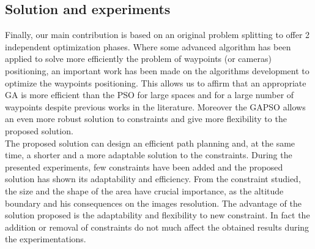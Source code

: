 \subsection{Solution and experiments }
Finally, our main contribution is based on an original problem splitting to offer 2 independent optimization phases. Where some advanced algorithm has been applied to solve more efficiently the problem of waypoints (or cameras) positioning, an important work has been made on the algorithms development to optimize the waypoints positioning. This allows us to affirm that an appropriate GA is more efficient than the PSO for large spaces and for a large number of waypoints despite previous works in the literature. Moreover the GAPSO allows an even more robust solution to constraints and give more flexibility to the proposed solution. \\
The proposed solution can design an efficient path planning and, at the same time, a shorter and a more adaptable solution to the constraints. During the presented experiments, few constraints have been added and the proposed solution has shown its adaptability and efficiency. From the constraint studied, the size and the shape of the area have crucial importance, as the altitude boundary and his consequences on the images resolution.
The advantage of the solution proposed is the adaptability and flexibility to new constraint. In fact the addition or removal of constraints do not much affect the obtained results during the experimentations.



